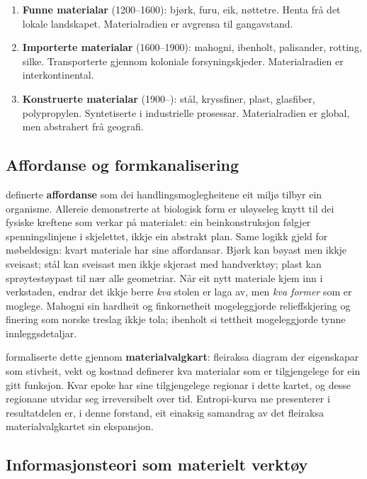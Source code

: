 \documentclass[10pt, a4paper, twocolumn]{article}
\begin{document}
\begin{enumerate}
  \item \textbf{Funne materialar} (1200--1600): bjørk, furu, eik, nøttetre. Henta frå det lokale landskapet. Materialradien er avgrensa til gangavstand.
  \item \textbf{Importerte materialar} (1600--1900): mahogni, ibenholt, palisander, rotting, silke. Transporterte gjennom koloniale forsyningskjeder. Materialradien er interkontinental.
  \item \textbf{Konstruerte materialar} (1900--): stål, kryssfiner, plast, glasfiber, polypropylen. Syntetiserte i industrielle prosessar. Materialradien er global, men abstrahert frå geografi.
\end{enumerate}

\subsection{Affordanse og formkanalisering}

\citet{gibson1977} definerte \textbf{affordanse} som dei handlingsmoglegheitene eit miljø tilbyr ein organisme. Allereie \citet{thompson_growth_1917} demonstrerte at biologisk form er uløyseleg knytt til dei fysiske kreftene som verkar på materialet: ein beinkonstruksjon følgjer spenningslinjene i skjelettet, ikkje ein abstrakt plan. Same logikk gjeld for møbeldesign: kvart materiale har sine affordansar. Bjørk kan bøyast men ikkje sveisast; stål kan sveisast men ikkje skjerast med handverktøy; plast kan sprøytestøypast til nær alle geometriar. Når eit nytt materiale kjem inn i verkstaden, endrar det ikkje berre \emph{kva} stolen er laga av, men \emph{kva former} som er moglege. Mahogni sin hardheit og finkornetheit mogeleggjorde relieffskjering og finering som norske treslag ikkje tola; ibenholt si tettheit mogeleggjorde tynne innleggsdetaljar.

\citet{ashby2013} formaliserte dette gjennom \textbf{materialvalgkart}: fleiraksa diagram der eigenskapar som stivheit, vekt og kostnad definerer kva materialar som er tilgjengelege for ein gitt funksjon. Kvar epoke har sine tilgjengelege regionar i dette kartet, og desse regionane utvidar seg irreversibelt over tid. Entropi-kurva me presenterer i resultatdelen er, i denne forstand, eit einaksig samandrag av det fleiraksa materialvalgkartet sin ekspansjon.

\subsection{Informasjonsteori som materielt verktøy}
\end{document}
